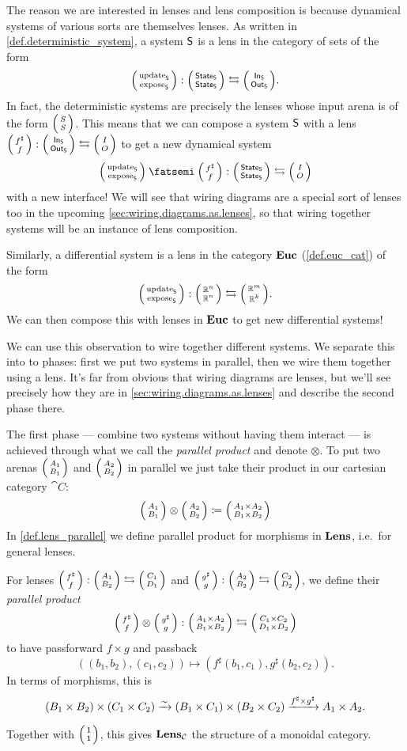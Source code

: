 \documentclass[DynamicalBook]{subfiles}
\begin{document}
The reason we are interested in lenses and lens composition is because
dynamical systems of various sorts are themselves lenses. As written in
\cref{def.deterministic_system}, a system $\mathsf{S}$ is a lens in the category of
sets of the form
$$\lens{\update{S}}{\expose{S}} : \lens{\State{S}}{\State{S}} \leftrightarrows \lens{\In{S}}{\Out{S}}.$$
In fact, the deterministic systems are precisely the lenses whose input arena is of the form $\lens SS$. This means that we can compose
a system $\mathsf{S}$ with a lens $\lens{f^{\sharp}}{f} : \lens{\In{S}}{\Out{S}}
\leftrightarrows \lens{I}{O}$ to get a new dynamical system
$$  \lens{\update{S}}{\expose{S}} \then \lens{f^{\sharp}}{f} :
\lens{\State{S}}{\State{S}} \leftrightarrows \lens{I}{O}$$
with a new interface! We will see that wiring diagrams are a special sort of lenses too in the upcoming \cref{sec:wiring.diagrams.as.lenses}, so that wiring together systems will be an instance of lens composition.

Similarly, a differential system is a lens in the category $\textbf{Euc}$ (\cref{def.euc_cat}) of the form
\[
\lens{\update{S}}{\expose{S}} : \lens{\rr^n}{\rr^n} \fromto \lens{\rr^m}{\rr^k}.
\]
We can then compose this with lenses in $\textbf{Euc}$ to get new differential systems!

We can use this observation to wire together different systems. We separate this into to phases: first we put two systems in parallel, then we wire them together using a lens. It's far from obvious that wiring diagrams are lenses, but we'll see precisely how they are in \cref{sec:wiring.diagrams.as.lenses} and describe the second phase there.

The first phase --- combine two systems without having them interact --- is achieved through what we call the \emph{parallel product} and denote $\otimes$. To put two arenas $\lens{A_1}{B_1}$ and $\lens{A_2}{B_2}$ in parallel we just take their product in our cartesian category $\cat{C}$:
\[
\lens{A_1}{B_1}\otimes\lens{A_2}{B_2}\coloneqq\lens{A_1\times A_2}{B_1\times B_2}
\]
In \cref{def.lens_parallel} we define parallel product for morphisms in $\textbf{Lens}$, i.e.\ for general lenses.

\begin{definition}\label{def.lens_parallel}
  For lenses $\lens{f^{\sharp}}{f} : \lens{A_1}{B_2} \leftrightarrows \lens{C_1}{D_1}$ and
  $\lens{g^{\sharp}}{g} : \lens{A_2}{B_2} \leftrightarrows \lens{C_2}{D_2}$, we
  define their \emph{parallel product} $$\lens{f^{\sharp}}{f} \otimes
  \lens{g^{\sharp}}{g} : \lens{A_1 \times A_2}{B_1 \times B_2} \leftrightarrows
  \lens{C_1 \times C_2}{D_1 \times D_2}$$
  to have passforward $f \times g$ and passback
  $$((b_1, b_2), (c_1, c_2)) \mapsto (f^{\sharp}(b_1, c_1), g^{\sharp}(b_2, c_2)).$$
  In terms of morphisms, this is
  $$(B_1 \times B_2) \times (C_1 \times C_2) \xrightarrow{\sim} (B_1 \times C_1) \times
  (B_2 \times C_2) \xrightarrow{f^{\sharp} \times g^{\sharp}} A_1 \times A_2.$$

  Together with $\lens{\ord{1}}{\ord{1}}$, this gives $\textbf{Lens}_{\mathcal{C}}$ the
  structure of a monoidal category.
\end{definition}
\end{document}
